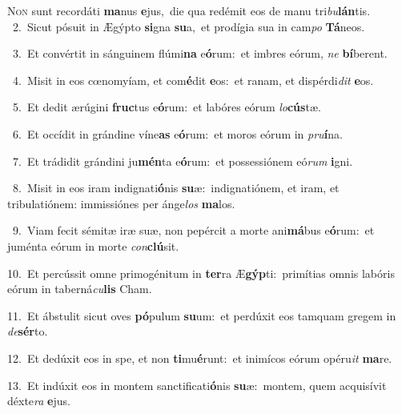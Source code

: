 \lettrine{\initial\textcolor{\initialcolor}{N}}{on} sunt recordáti \textbf{ma}\-nus \textbf{e}\-jus,~\star die qua redémit eos de manu tri\-\textit{bu}\-\textbf{lán}tis.\\
{\numbfont\textcolor{\numbcolor}{~2.}}~Sicut pósuit in Ægýpto \textbf{si}\-gna \textbf{su}\-a,~\star et prodígia sua in cam\textit{po} \textbf{Tá}\-neos.\par
{\numbfont\textcolor{\numbcolor}{~3.}}~Et convértit in sánguinem flúmi\textbf{na} e\-\textbf{ó}\-rum:~\star et imbres eórum, \textit{ne} \textbf{bí}\-berent.\par
{\numbfont\textcolor{\numbcolor}{~4.}}~Misit in eos cœnomyíam, et com\-\textbf{é}\-dit \textbf{e}\-os:~\star et ranam, et dispérdi\textit{dit} \textbf{e}\-os.\par
{\numbfont\textcolor{\numbcolor}{~5.}}~Et dedit ærúgini \textbf{fruc}\-tus e\-\textbf{ó}\-rum:~\star et labóres eórum \textit{lo}\-\textbf{cús}tæ.\par
{\numbfont\textcolor{\numbcolor}{~6.}}~Et occídit in grándine víne\textbf{as} e\-\textbf{ó}\-rum:~\star et moros eórum in \textit{pru}\-\textbf{í}na.\par
{\numbfont\textcolor{\numbcolor}{~7.}}~Et trádidit grándini ju\-\textbf{mén}\-ta e\-\textbf{ó}\-rum:~\star et possessiónem eó\textit{rum} \textbf{i}\-gni.\par
{\numbfont\textcolor{\numbcolor}{~8.}}~Misit in eos iram indignati\-\textbf{ó}\-nis \textbf{su}\-æ:~\star indignatiónem, et iram, et tribulatiónem: immissiónes per ánge\textit{los} \textbf{ma}\-los.\par
{\numbfont\textcolor{\numbcolor}{~9.}}~Viam fecit sémitæ iræ suæ, non pepércit a morte ani\-\textbf{má}\-bus e\-\textbf{ó}\-rum:~\star et juménta eórum in morte \textit{con}\-\textbf{clú}sit.\par
{\numbfont\textcolor{\numbcolor}{10.}}~Et percússit omne primogénitum in \textbf{ter}\-ra Æ\-\textbf{gýp}\-ti:~\star primítias omnis labóris eórum in taberná\-\textit{cu}\-\textbf{lis} Cham.\par
{\numbfont\textcolor{\numbcolor}{11.}}~Et ábstulit sicut oves \textbf{pó}\-pulum \textbf{su}\-um:~\star et perdúxit eos tamquam gregem in \textit{de}\-\textbf{sér}to.\par
{\numbfont\textcolor{\numbcolor}{12.}}~Et dedúxit eos in spe, et non \textbf{ti}\-mu\-\textbf{é}\-runt:~\star et inimícos eórum opéru\textit{it} \textbf{ma}\-re.\par
{\numbfont\textcolor{\numbcolor}{13.}}~Et indúxit eos in montem sanctificati\-\textbf{ó}\-nis \textbf{su}\-æ:~\star montem, quem acquisívit déxte\textit{ra} \textbf{e}\-jus.\par
